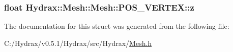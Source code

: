 \hypertarget{struct_hydrax_1_1_mesh_1_1_p_o_s___v_e_r_t_e_x_e482c65ad4db2566986f7d29c487d9e4}{
\subsubsection[{z}]{\setlength{\rightskip}{0pt plus 5cm}float Hydrax::Mesh::Mesh::POS\_\-VERTEX::z}}
\label{struct_hydrax_1_1_mesh_1_1_p_o_s___v_e_r_t_e_x_e482c65ad4db2566986f7d29c487d9e4}




The documentation for this struct was generated from the following file:\begin{CompactItemize}
\item 
C:/Hydrax/v0.5.1/Hydrax/src/Hydrax/\hyperlink{_mesh_8h}{Mesh.h}\end{CompactItemize}
